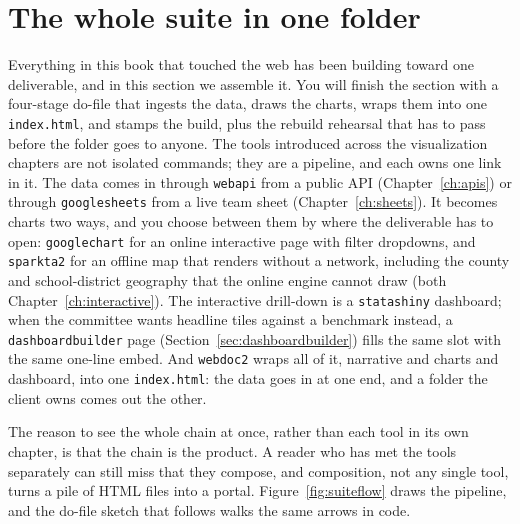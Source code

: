 \section{The whole suite in one folder}\label{sec:capstone}
Everything in this book that touched the web has been building toward one deliverable, and in this section we assemble it. You will finish the section with a four-stage do-file that ingests the data, draws the charts, wraps them into one \texttt{index.html}, and stamps the build, plus the rebuild rehearsal that has to pass before the folder goes to anyone. The tools introduced across the visualization chapters are not isolated commands; they are a pipeline, and each owns one link in it. The data comes in through \texttt{webapi} from a public API (Chapter~\ref{ch:apis}) or through \texttt{googlesheets} from a live team sheet (Chapter~\ref{ch:sheets}). It becomes charts two ways, and you choose between them by where the deliverable has to open: \texttt{googlechart} for an online interactive page with filter dropdowns, and \texttt{sparkta2} for an offline map that renders without a network, including the county and school-district geography that the online engine cannot draw (both Chapter~\ref{ch:interactive}). The interactive drill-down is a \texttt{statashiny} dashboard; when the committee wants headline tiles against a benchmark instead, a \texttt{dashboardbuilder} page (Section~\ref{sec:dashboardbuilder}) fills the same slot with the same one-line embed. And \texttt{webdoc2} wraps all of it, narrative and charts and dashboard, into one \texttt{index.html}: the data goes in at one end, and a folder the client owns comes out the other.

The reason to see the whole chain at once, rather than each tool in its own chapter, is that the chain is the product. A reader who has met the tools separately can still miss that they compose, and composition, not any single tool, turns a pile of HTML files into a portal. Figure~\ref{fig:suiteflow} draws the pipeline, and the do-file sketch that follows walks the same arrows in code.

